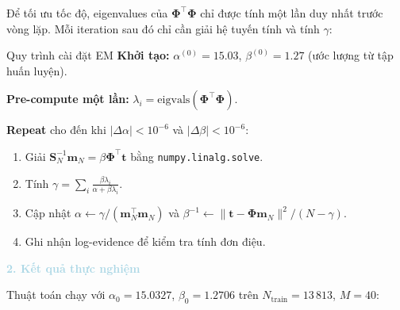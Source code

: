 Để tối ưu tốc độ, eigenvalues của $\mathbf{\Phi}^\top\mathbf{\Phi}$ chỉ được tính một lần duy nhất trước vòng lặp. Mỗi iteration sau đó chỉ cần giải hệ tuyến tính và tính $\gamma$:

\begin{importantbox}{Quy trình cài đặt EM}
\textbf{Khởi tạo:} $\alpha^{(0)} = 15.03$, $\beta^{(0)} = 1.27$ (ước lượng từ tập huấn luyện).

\textbf{Pre-compute một lần:} $\lambda_i = \mathrm{eigvals}(\mathbf{\Phi}^\top\mathbf{\Phi})$.

\textbf{Repeat} cho đến khi $|\Delta\alpha| < 10^{-6}$ và $|\Delta\beta| < 10^{-6}$:
\begin{enumerate}
    \item Giải $\mathbf{S}_N^{-1}\mathbf{m}_N = \beta\mathbf{\Phi}^\top\mathbf{t}$ bằng \texttt{numpy.linalg.solve}.
    \item Tính $\gamma = \sum_i \frac{\beta\lambda_i}{\alpha + \beta\lambda_i}$.
    \item Cập nhật $\alpha \leftarrow \gamma/(\mathbf{m}_N^\top\mathbf{m}_N)$ và $\beta^{-1} \leftarrow \|\mathbf{t} - \mathbf{\Phi}\mathbf{m}_N\|^2/(N-\gamma)$.
    \item Ghi nhận log-evidence để kiểm tra tính đơn điệu.
\end{enumerate}
\end{importantbox}

\vspace{0.5em}
\noindent\textcolor{lightblue}{\textbf{2. Kết quả thực nghiệm}}
\vspace{0.5em}

Thuật toán chạy với $\alpha_0 = 15.0327$, $\beta_0 = 1.2706$ trên
$N_\text{train} = 13\,813$, $M = 40$:


